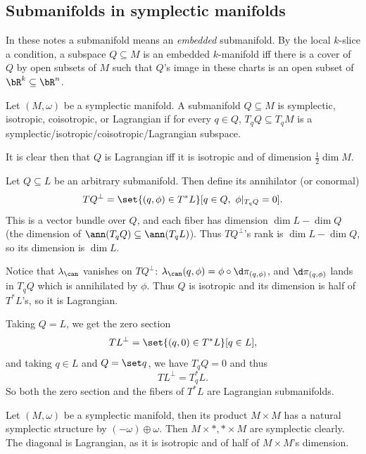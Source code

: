 \subsection{Submanifolds in symplectic manifolds}

In these notes a submanifold means an {\it embedded\/} submanifold.
By the local $k$-slice a condition, a subspace $Q\subseteq M$ is an embedded $k$-manifold iff there is a cover of $Q$ by open subsets of $M$
such that $Q$'s image in these charts is an open subset of $\bR^k\subseteq\bR^n$.

\bdefn

    Let $(M,\omega)$ be a symplectic manifold.
    A submanifold $Q\subseteq M$ is {\emphcolor symplectic}, {\emphcolor isotropic}, {\emphcolor coisotropic}, or {\emphcolor Lagrangian}
    if for every $q\in Q$, $T_qQ\subseteq T_qM$ is a symplectic/isotropic/coisotropic/Lagrangian subspace.

\edefn

It is clear then that $Q$ is Lagrangian iff it is isotropic and of dimension $\frac12\dim M$.

\bexam

    Let $Q\subseteq L$ be an arbitrary submanifold.
    Then define its {\emphcolor annihilator} (or {\emphcolor conormal})
    $$ TQ^\perp = \set{(q,\phi)\in T^*L}[q\in Q,\ \phi|_{T_qQ}=0] . $$
    This is a vector bundle over $Q$, and each fiber has dimension $\dim L-\dim Q$ (the dimension of $\ann(T_qQ)\subseteq\ann(T_qL)$).
    Thus $TQ^\perp$'s rank is $\dim L-\dim Q$, so its dimension is $\dim L$.

    Notice that $\lambda_\can$ vanishes on $TQ^\perp$: $\lambda_\can(q,\phi)=\phi\circ\d\pi_{(q,\phi)}$, and $\d\pi_{(q,\phi)}$ lands in $T_qQ$ which
    is annihilated by $\phi$.
    Thus $Q$ is isotropic and its dimension is half of $T^*L$'s, so it is Lagrangian.

    Taking $Q=L$, we get the zero section
    $$ TL^\perp = \set{(q,0)\in T^*L}[q\in L] , $$
    and taking $q\in L$ and $Q=\set q$, we have $T_qQ=0$ and thus
    $$ TL^\perp = T_q^*L . $$
    So both the zero section and the fibers of $T^*L$ are Lagrangian submanifolds.

\eexam

\bexam

    Let $(M,\omega)$ be a symplectic manifold, then its product $M\times M$ has a natural symplectic structure by $(-\omega)\oplus\omega$.
    Then $M\times*,*\times M$ are symplectic clearly.
    The diagonal is Lagrangian, as it is isotropic and of half of $M\times M$'s dimension.

